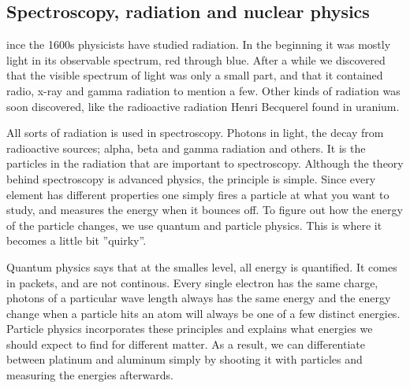 \subsection*{Spectroscopy, radiation and nuclear physics}
ince the 1600s physicists have studied radiation.
In the beginning it was mostly light in its observable spectrum, red through blue.
After a while we discovered that the visible spectrum of light was only a small part, and that it contained radio, x-ray and gamma radiation to mention a few.
Other kinds of radiation was soon discovered, like the radioactive radiation Henri Becquerel \cite{First_radioactivity} found in uranium.

All sorts of radiation is used in spectroscopy. Photons in light, the decay from radioactive sources; alpha, beta and gamma radiation and others.
It is the particles in the radiation that are important to spectroscopy.
Although the theory behind spectroscopy is advanced physics, the principle is simple.
Since every element has different properties one simply fires a particle at what you want to study, and measures the energy when it bounces off.
To figure out how the energy of the particle changes, we use quantum and particle physics.
This is where it becomes a little bit ''quirky''.

Quantum physics says that at the smalles level, all energy is quantified.
It comes in packets, and are not continous.
Every single electron has the same charge, photons of a particular wave length always has the same energy and the energy change when a particle hits an atom will always be one of a few distinct energies.
Particle physics incorporates these principles and explains what energies we should expect to find for different matter.
As a result, we can differentiate between platinum and aluminum simply by shooting it with particles and measuring the energies afterwards.